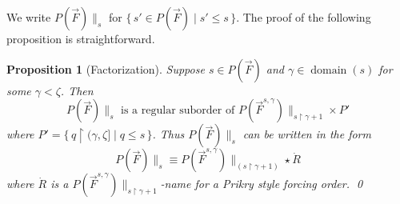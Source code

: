 \documentclass[
twoside,
]{article}
\newtheorem{lemma}[theorem]{Lemma}
\newtheorem{proposition}[theorem]{Proposition}
\theoremstyle{definition}
\theoremstyle{remark}
\newcommand{\below}[2]{#1{\|_{#2}}}
\newcommand{\set}[1]{\{\,#1\,\}}
\newcommand{\restrict}{{\upharpoonright}}
\DeclareMathOperator{\domain}{domain}
\begin{document}
\begin{comment}
\begin{lemma}
  \label{thm:apaOK}
  Suppose $a_1\supset a_0$.  Then $\set{(a'_1,a'_0)\mid
    f_{a_1,a'_1}\supset f_{a_0,a'_0}}\in F_{a_1,a_0}$.
\end{lemma}
  \begin{proof}
    Let $\pi_0\colon\kappa\to\domain(a_0)$ and
    $\pi_1\colon\kappa\to\domain(a_1)$ be the associated enumerations
    and set $\sigma=\pi_1^{-1}\circ\pi_0 \colon\kappa\to\kappa$ and
    $A=\set{\lambda<\kappa\mid \sigma[\lambda]\subseteq\lambda}$.
    Then
    $B=\set{(a'_1,a'_0)\mid \exists \lambda\in
      A\;(\pi'_0=\pi_1'\circ(\sigma\restrict\lambda)}\in F_{a_1,a_0}}$,
    and for any $(a'_0,a'_1)\in B$ and
    $\xi\in\domain(a_0)\cap \pi_0[\lambda]$ we have
    \begin{align*}
      f_{a_0,a'_0}(\xi)&=\pi_{0}'\circ \pi_0^{-1}(\xi)\\
                       &=\pi_{1}'\circ\sigma\circ
                         (\pi_1\circ\sigma)^{-1}(\xi)\\
                       &=\pi_1'\circ \sigma \circ
                         \sigma^{-1}\circ  \pi_1^{-1}(\xi)\\
                       &=\pi'_{1}\circ \pi_{1}^{-1}(\xi)
                         =f_{a_1,a'_1}(\xi).
    \end{align*}
  \end{proof}
\end{comment}

 We write $\below{P(\vec F)} s$ for $\set{s'\in P(\vec F)\mid s'\leq
  s}$.   The proof of the following proposition is straightforward.

\begin{proposition}[Factorization]  Suppose $s\in P(\vec F)$ and
  $\gamma\in\domain(s)$ for some $\gamma<\zeta$.  Then
  \label{thm:factorization}
    \begin{equation}
      \label{eq:factorizationexact}
      \below{P(\vec F)}{s} \text{ is a regular suborder
        of }\below{P(\vec F^{s,\gamma})}{s\restrict\gamma+1}\times
      P'
  \end{equation}
    where $P'=\set{q\restrict(\gamma,\zeta]\mid q\leq s}$.
    Thus  $\below{P(\vec F)}{s}$ can be written in the form
    \begin{equation}\label{eq:factorizationstar}
      \below{P(\vec F)}{s}\equiv
      \below{P(\vec   F^{s,\gamma})}{(s\restrict\gamma+1)}    \star\dot R
    \end{equation}
    where  $\dot R$ is a $\below{P(\vec
      F^{s,\gamma})}{s\restrict\gamma+1}$-name for a  Prikry style forcing order.
    \qed
\end{proposition}
\end{document}
